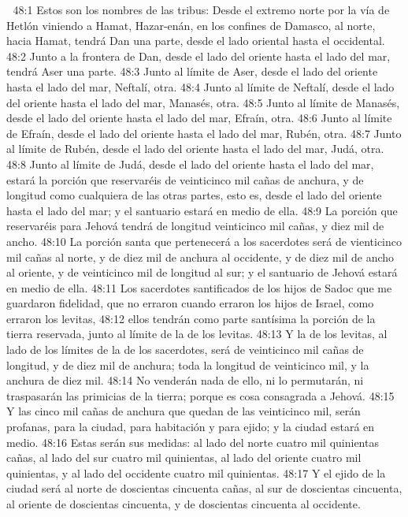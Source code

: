 
48:1 Estos son los nombres de las tribus: Desde el extremo norte por la vía de Hetlón viniendo a Hamat, Hazar-enán, en los confines de Damasco, al norte, hacia Hamat, tendrá Dan una parte, desde el lado oriental hasta el occidental.  
48:2 Junto a la frontera de Dan, desde el lado del oriente hasta el lado del mar, tendrá Aser una parte.  
48:3 Junto al límite de Aser, desde el lado del oriente hasta el lado del mar, Neftalí, otra.  
48:4 Junto al límite de Neftalí, desde el lado del oriente hasta el lado del mar, Manasés, otra.  
48:5 Junto al límite de Manasés, desde el lado del oriente hasta el lado del mar, Efraín, otra.  
48:6 Junto al límite de Efraín, desde el lado del oriente hasta el lado del mar, Rubén, otra.  
48:7 Junto al límite de Rubén, desde el lado del oriente hasta el lado del mar, Judá, otra.  
48:8 Junto al límite de Judá, desde el lado del oriente hasta el lado del mar, estará la porción que reservaréis de veinticinco mil cañas   de anchura, y de longitud como cualquiera de las otras partes, esto es, desde el lado del oriente hasta el lado del mar; y el santuario estará en medio de ella.  
48:9 La porción que reservaréis para Jehová tendrá de longitud veinticinco mil cañas,  y diez mil de ancho.  
48:10 La porción santa que pertenecerá a los sacerdotes será de vienticinco mil cañas   al norte, y de diez mil de anchura al occidente, y de diez mil de ancho al oriente, y de veinticinco mil de longitud al sur; y el santuario de Jehová estará en medio de ella.  
48:11 Los sacerdotes santificados de los hijos de Sadoc que me guardaron fidelidad, que no erraron cuando erraron los hijos de Israel, como erraron los levitas,  
48:12 ellos tendrán como parte santísima la porción de la tierra reservada, junto al límite de la de los levitas.  
48:13 Y la de los levitas, al lado de los límites de la de los sacerdotes, será de veinticinco mil cañas   de longitud, y de diez mil de anchura; toda la longitud de veinticinco mil, y la anchura de diez mil.  
48:14 No venderán nada de ello, ni lo permutarán, ni traspasarán las primicias de la tierra; porque es cosa consagrada a Jehová.  
48:15 Y las cinco mil cañas   de anchura que quedan de las veinticinco mil, serán profanas, para la ciudad, para habitación y para ejido; y la ciudad estará en medio.  
48:16 Estas serán sus medidas: al lado del norte cuatro mil quinientas cañas,  al lado del sur cuatro mil quinientas, al lado del oriente cuatro mil quinientas, y al lado del occidente cuatro mil quinientas.  
48:17 Y el ejido de la ciudad será al norte de doscientas cincuenta cañas,  al sur de doscientas cincuenta, al oriente de doscientas cincuenta, y de doscientas cincuenta al occidente. 
